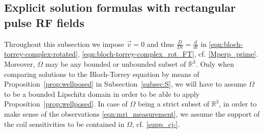 \documentclass{ws-m3as}
\begin{document}
\subsection{Explicit solution formulas with rectangular pulse RF fields}\label{sec:explsol}
Throughout this subsection we impose ${\vec v}=0$ and thus $\frac{D}{Dt}=\frac{d}{dt}$ in 
\eqref{eqn:bloch-torrey-complex-rotated}, \eqref{eqn:bloch-torrey-complex_rot_FT}, cf. \eqref{Mperp_prime}.
Moreover, $\Omega$ may be any bounded or unbounded subset of $\mathbb{R}^3$.
Only when comparing solutions to the Bloch-Torrey equation by means of Proposition~\ref{prop:wellposed} in Subsection~\ref{subsec:S}, we will have to assume $\Omega$ to be a bounded Lipschitz domain in order to be able to apply Proposition~\ref{prop:wellposed}.  
In case of $\Omega$ being a strict subset of $\mathbb{R}^3$, in order to make sense of the observations \eqref{eqn:mri_measurement}, we assume the support of the coil sensitivities to be contained in $\Omega$, cf. \eqref{supp_cj-}.
\end{document}
